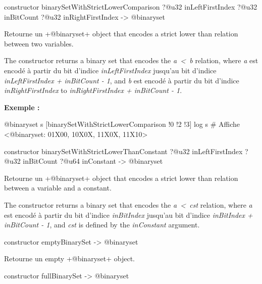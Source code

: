 \begin{galgas4box}
constructor binarySetWithStrictLowerComparison
  ?@u32 inLeftFirstIndex
  ?@u32 inBitCount
  ?@u32 inRightFirstIndex
  -> @binaryset
\end{galgas4box}


Retourne un \ggsq+@binaryset+ object that encodes a strict lower than relation between two variables.

The constructor returns a binary set that encodes the \emph{a~<~b} relation, where \emph{a} est encodé à partir du bit d'indice \emph{inLeftFirstIndex} jusqu'au bit d'indice \emph{inLeftFirstIndex  + inBitCount - 1}, and \emph{b} est encodé à partir du bit d'indice \emph{inRightFirstIndex} to \emph{inRightFirstIndex + inBitCount - 1}.

\textbf{Exemple :}
\begin{galgas4}
@binaryset s [binarySetWithStrictLowerComparison !0 !2 !3]
log s # Affiche <@binaryset: 01X00, 10X0X, 11X0X, 11X10>
\end{galgas4}





\begin{galgas4box}
constructor binarySetWithStrictLowerThanConstant
  ?@u32 inLeftFirstIndex
  ?@u32 inBitCount
  ?@u64 inConstant
  -> @binaryset
\end{galgas4box}


Retourne un \ggsq+@binaryset+ object that encodes a strict lower than relation between a variable and a constant.

The constructor returns a binary set that encodes the \emph{a~<~cst} relation, where \emph {a} est encodé à partir du bit d'indice \emph{inBitIndex} jusqu'au bit d'indice \emph{inBitIndex  + inBitCount - 1}, and \emph{cst} is defined by the \emph{inConstant} argument.





\begin{galgas4box}
constructor emptyBinarySet -> @binaryset
\end{galgas4box}


Retourne un empty \ggsq+@binaryset+ object.






\begin{galgas4box}
constructor fullBinarySet -> @binaryset
\end{galgas4box}

